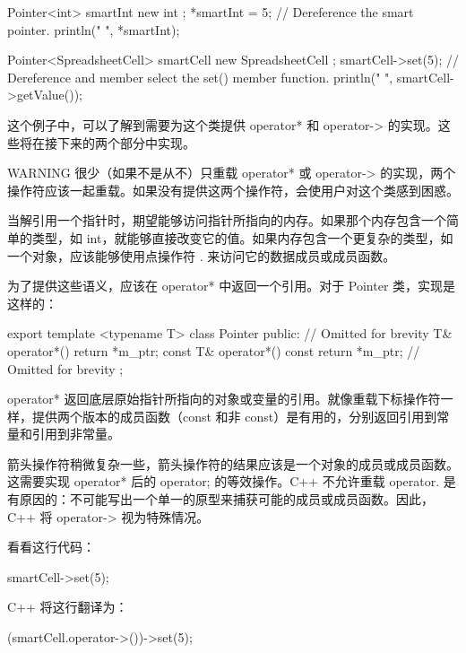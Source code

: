 \begin{cpp}
Pointer<int> smartInt { new int };
*smartInt = 5; // Dereference the smart pointer.
println("{} ", *smartInt);

Pointer<SpreadsheetCell> smartCell { new SpreadsheetCell };
smartCell->set(5); // Dereference and member select the set() member function.
println("{} ", smartCell->getValue());
\end{cpp}

这个例子中，可以了解到需要为这个类提供 operator* 和 operator-> 的实现。这些将在接下来的两个部分中实现。

\begin{myWarning}{WARNING}
很少（如果不是从不）只重载 operator* 或 operator-> 的实现，两个操作符应该一起重载。如果没有提供这两个操作符，会使用户对这个类感到困惑。
\end{myWarning}


当解引用一个指针时，期望能够访问指针所指向的内存。如果那个内存包含一个简单的类型，如 int，就能够直接改变它的值。如果内存包含一个更复杂的类型，如一个对象，应该能够使用点操作符 . 来访问它的数据成员或成员函数。

为了提供这些语义，应该在 operator* 中返回一个引用。对于 Pointer 类，实现是这样的：

\begin{cpp}
export template <typename T> class Pointer
{
    public:
        // Omitted for brevity
        T& operator*() { return *m_ptr; }
        const T& operator*() const { return *m_ptr; }
        // Omitted for brevity
};
\end{cpp}

operator* 返回底层原始指针所指向的对象或变量的引用。就像重载下标操作符一样，提供两个版本的成员函数（const 和非 const）是有用的，分别返回引用到常量和引用到非常量。


箭头操作符稍微复杂一些，箭头操作符的结果应该是一个对象的成员或成员函数。这需要实现 operator* 后的 operator; 的等效操作。C++ 不允许重载 operator. 是有原因的：不可能写出一个单一的原型来捕获可能的成员或成员函数。因此，C++ 将 operator-> 视为特殊情况。

看看这行代码：

\begin{cpp}
smartCell->set(5);
\end{cpp}

C++ 将这行翻译为：

\begin{cpp}
(smartCell.operator->())->set(5);
\end{cpp}

